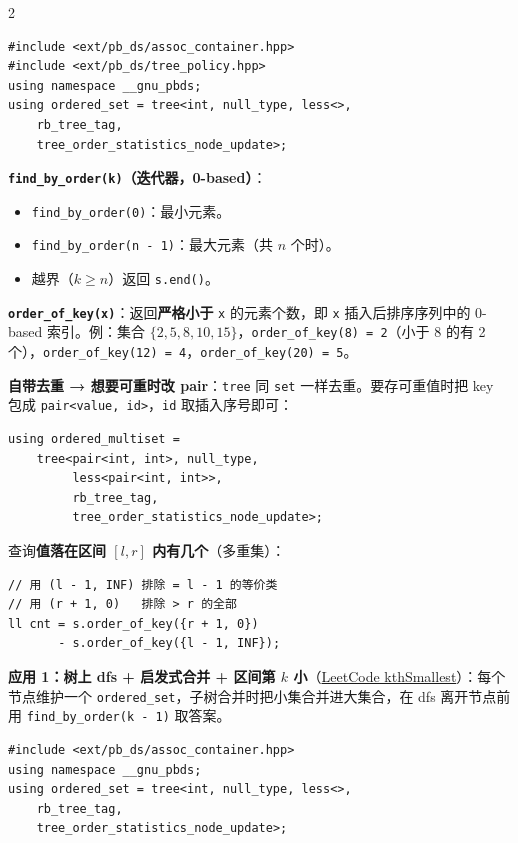 \begin{multicols*}{2}
		\begin{verbatim}
#include <ext/pb_ds/assoc_container.hpp>
#include <ext/pb_ds/tree_policy.hpp>
using namespace __gnu_pbds;
using ordered_set = tree<int, null_type, less<>,
    rb_tree_tag,
    tree_order_statistics_node_update>;
		\end{verbatim}

		\textbf{\texttt{find\_by\_order(k)}（迭代器，0-based）}：

		\begin{itemize}
			\item \verb|find_by_order(0)|：最小元素。
			\item \verb|find_by_order(n - 1)|：最大元素（共 $n$ 个时）。
			\item 越界（$k \ge n$）返回 \verb|s.end()|。
		\end{itemize}

		\textbf{\texttt{order\_of\_key(x)}}：返回\textbf{严格小于} \verb|x| 的元素个数，即 \verb|x| 插入后排序序列中的 0-based 索引。例：集合 $\{2,5,8,10,15\}$，\verb|order_of_key(8) = 2|（小于 8 的有 2 个），\verb|order_of_key(12) = 4|，\verb|order_of_key(20) = 5|。

		\textbf{自带去重 → 想要可重时改 pair}：\verb|tree| 同 \verb|set| 一样去重。要存可重值时把 key 包成 \verb|pair<value, id>|，\verb|id| 取插入序号即可：

		\begin{verbatim}
using ordered_multiset =
    tree<pair<int, int>, null_type,
         less<pair<int, int>>,
         rb_tree_tag,
         tree_order_statistics_node_update>;
		\end{verbatim}

		查询\textbf{值落在区间 $[l, r]$ 内有几个}（多重集）：

		\begin{verbatim}
// 用 (l - 1, INF) 排除 = l - 1 的等价类
// 用 (r + 1, 0)   排除 > r 的全部
ll cnt = s.order_of_key({r + 1, 0})
       - s.order_of_key({l - 1, INF});
		\end{verbatim}

		\textbf{应用 1：树上 dfs + 启发式合并 + 区间第 $k$ 小}（\href{https://leetcode.cn/problems/kth-smallest-path-xor-sum/}{LeetCode kthSmallest}）：每个节点维护一个 \verb|ordered_set|，子树合并时把小集合并进大集合，在 dfs 离开节点前用 \verb|find_by_order(k - 1)| 取答案。

		\begin{verbatim}
#include <ext/pb_ds/assoc_container.hpp>
using namespace __gnu_pbds;
using ordered_set = tree<int, null_type, less<>,
    rb_tree_tag,
    tree_order_statistics_node_update>;


\end{verbatim}
\end{multicols*}
